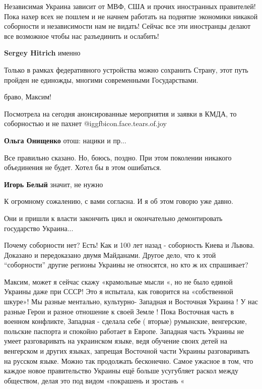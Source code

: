 \begin{itemize}

Независимая Украина зависит от МВФ, США и прочих иностранных правителей! Пока
нахер всех не пошлем и не начнем работать на поднятие экономики никакой
соборности и независимости нам не видать! Сейчас все эти иностранцы делают все
возможное чтобы нас разъединить и ослабить!


\textbf{Sergey Hitrich} именно


Только в рамках федеративного устройства можно сохранить Страну, этот путь
пройден не единожды, многими современными Государствами.

браво, Максим!


Посмотрела на сегодня анонсированные мероприятия и заявки в КМДА, то
соборностью и не пахнет @igg{fbicon.face.tears.of.joy} 

\textbf{Ольга Онищенко} отош: нацики и пр...

Все правильно сказано. Но, боюсь, поздно. При этом поколении никакого
объединения не будет. Хотел бы в этом ошибаться.

\begin{itemize} %
\textbf{Игорь Белый} значит, не нужно

К огромному сожалению, с вами согласна. И я об этом говорю уже давно.
\end{itemize} %

Они и пришли к власти закончить цикл и окончательно демонтировать государство Украина...


Почему соборности нет? Есть! Как и 100 лет назад - соборность Киева и Львова.
Доказано и передоказано двумя Майданами. Другое дело, что к этой \enquote{соборности}
другие регионы Украины не относятся, но кто ж их спрашивает?



Максим, может я сейчас скажу «крамольные мысли «, но не было единой Украины
даже при СССР! Это я испытала, как говорится на «собственной шкуре»! Мы разные
ментально, культурно- Западная и Восточная Украина ! У нас разные Герои и
разное отношение к своей Земле ! Пока Восточная часть в военном конфликте,
Западная - сделала себе ( вторые) румынские, венгерские, польские паспорта и
спокойно работает в Европе. Западная часть Украины не умеет разговаривать на
украинском языке, ведя обучение своих детей на венгерском и других языках,
запрещая Восточной части Украины разговаривать на русском языке. Можно так
продолжать бесконечно. Самое ужасное в том, что каждое новое правительство
Украины ещё больше усугубляет раскол между обществом, делая это под видом
«покрашень и зростань «

\end{itemize} %
